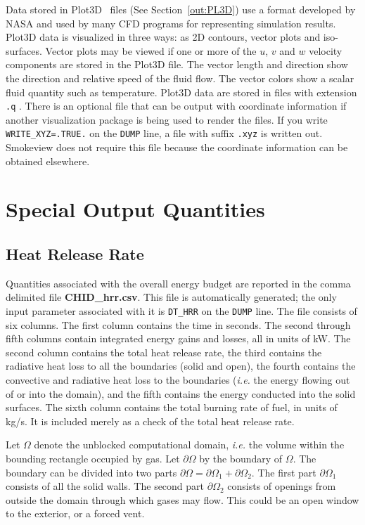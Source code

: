 \documentclass[11pt]{book}
\newcommand{\ct}{\tt\small}
\begin{document}
Data stored in Plot3D~\cite{PLOT3D} files (See Section~\ref{out:PL3D}) use a format developed by
NASA and used by many CFD programs for representing simulation results.
Plot3D data is visualized in three ways: as 2D contours, vector plots and iso-surfaces.
Vector plots may be viewed if one or more of the $u$, $v$ and $w$
velocity components are stored in the Plot3D file. The vector
length and direction show the direction and relative speed of the
fluid flow. The vector colors show a scalar fluid quantity such as
temperature.
Plot3D data are stored in files with extension {\ct .q} . There is
an optional file that can be output with coordinate information
if another visualization package is being used to render the
files. If you write {\ct WRITE\_XYZ=.TRUE.} on the {\ct DUMP}
line, a file with suffix {\ct .xyz} is written out. Smokeview
does not require this file because the coordinate information can be
obtained elsewhere.


\clearpage

\section{Special Output Quantities}

\subsection{Heat Release Rate}
\label{info:HRR} 

Quantities associated with the overall energy budget are
reported in the comma delimited file {\bf CHID\_hrr.csv}.
This file is automatically generated; the only input parameter associated with it is
{\ct DT\_HRR} on the {\ct DUMP} line. The file consists of six columns.
The first column contains the time in seconds. The second through
fifth columns contain integrated energy gains and losses, all in
units of kW. The second column contains the total heat release rate, the third contains the
radiative heat loss to all the boundaries (solid and open), the fourth contains the
convective and radiative heat loss to the boundaries ({\em i.e.} the energy
flowing out of or into the domain), and the fifth contains the energy conducted
into the solid surfaces.
The sixth column contains the total burning rate of fuel, in units of kg/s. It is included merely as a check
of the total heat release rate.

Let $\Omega$ denote the unblocked computational domain, {\em i.e.} the volume within the bounding rectangle
occupied by gas. Let $\partial \Omega$ by the boundary of $\Omega$. The boundary can be divided into two parts
$\partial \Omega = \partial \Omega_1 + \partial \Omega_2$. The first part $\partial \Omega_1$ consists of all the solid
walls. The second part $\partial \Omega_2$ consists of openings from outside the domain through which gases may flow. This
could be an open window to the exterior, or a forced vent.
\end{document}
